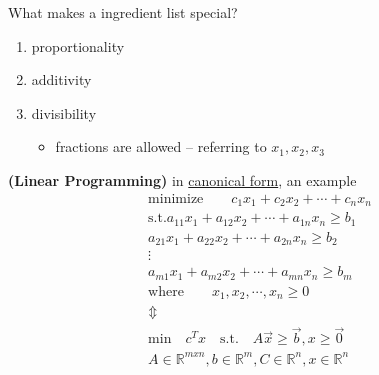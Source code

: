 What makes a ingredient list special?
\begin{enumerate}
	\item proportionality
	\item additivity
	\item divisibility
	\begin{itemize}
		\item fractions are allowed -- referring to $x_1, x_2, x_3$
	\end{itemize}
\end{enumerate}
\textbf{(Linear Programming)} in \underline{canonical form}, an example
\begin{gather*}
	\text{minimize} \qquad c_1x_1 + c_2x_2 + \cdots + c_nx_n\\
	\text{s.t.} a_{11}x_1 + a_{12}x_2 + \cdots + a_{1n}x_n \geq b_1\\
	a_{21}x_1 + a_{22}x_2 + \cdots + a_{2n}x_n \geq b_2\\
	\vdots\\
	a_{m1}x_1 + a_{m2}x_2 + \cdots + a_{mn}x_n \geq b_m\\
	\text{where} \qquad x_1, x_2, \cdots, x_n \geq 0\\
	\Updownarrow\\
	\text{min} \quad c^Tx \quad \text{s.t.} \quad A\vec{x} \geq \vec{b}, x \geq \vec{0}\\
	A \in \mathbb{R}^{mxn}, b \in \mathbb{R}^m, C \in \mathbb{R}^n, x \in \mathbb{R}^n
\end{gather*}
